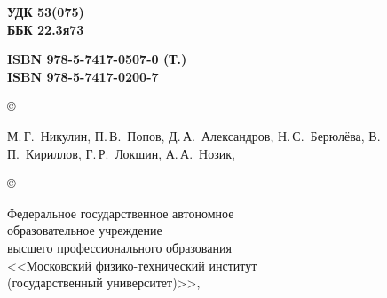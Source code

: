 {\footnotesize
\hfill\parbox{2cm}{\bfseries УДК 53(075)\\
ББК 22.3я73\par}

\vskip 4mm


\settowidth{\vva}{\footnotesize\bf ISBN 978-5-7417-0507-0 (Т.\tom)}%
\noindent
\parbox[t]{\vva}{\footnotesize\bf
ISBN 978-5-7417-0507-0 (Т.\tom)\\
ISBN 978-5-7417-0200-7
}
\setlength{\vvc}{\textwidth}%
\addtolength{\vvc}{-\vva}%
\setlength{\vvb}{3em}%
\addtolength{\vvc}{-\vvb}%
\hfill
\copyright~\parbox[t]{\vvc}{%
\strut
М.\,Г.~Никулин,
П.\,В.~Попов,
Д.\,А.~Александров,
Н.\,С.~Берюлёва,
В.\,П.~Кириллов,
Г.\,Р.~Локшин,
А.\,А.~Нозик, \god}

\smallskip

\hfill
\copyright~\parbox[t]{\vvc}{\raggedright
Федеральное государственное автономное\\
образовательное учреждение\\
высшего профессионального образования\\
<<Московский физико-технический институт\\
(государственный университет)>>, \god}



}
